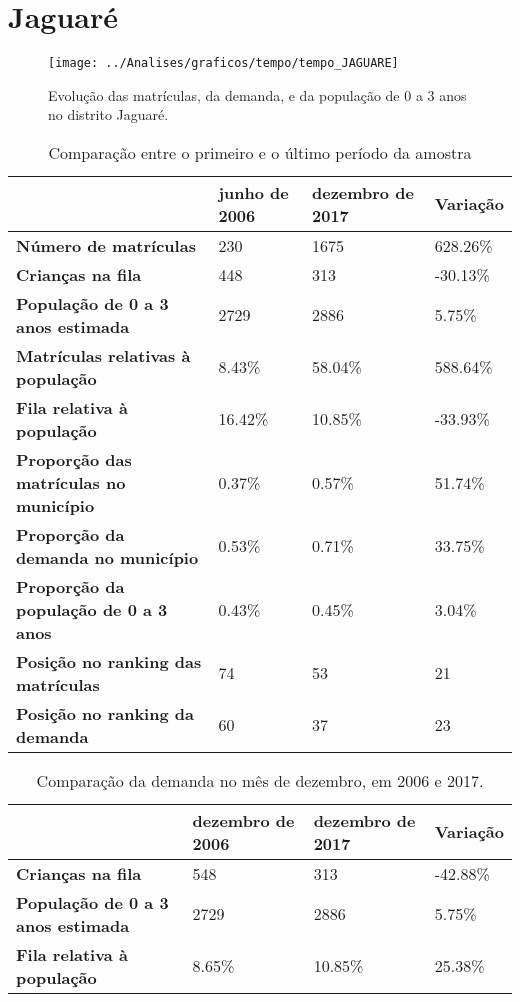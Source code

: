 \section{Jaguaré}
\begin{figure}[H]
\centering
\texttt{[image: ../Analises/graficos/tempo/tempo\_JAGUARE]}
\caption{Evolução das matrículas, da demanda, e da população de 0 a 3 anos no distrito Jaguaré.}
\end{figure}
\begin{table}[H]
\begin{tabular}{|l|l|l|l|}
\hline
\textbf{}                                      & \textbf{junho de 2006}       & \textbf{dezembro de 2017}    & \textbf{Variação} \\ \hline
\textbf{Número de matrículas}                  & 230 & 1675 & 628.26\% \\ \hline
\textbf{Crianças na fila}                      & 448 & 313 & -30.13\% \\ \hline
\textbf{População de 0 a 3 anos estimada}      & 2729 & 2886 & 5.75\% \\ \hline
\textbf{Matrículas relativas à população}      & 8.43\% & 58.04\% & 588.64\% \\ \hline
\textbf{Fila relativa à população}             & 16.42\% & 10.85\% & -33.93\% \\ \hline
\textbf{Proporção das matrículas no município} & 0.37\% & 0.57\% & 51.74\% \\ \hline
\textbf{Proporção da demanda no município}     & 0.53\% & 0.71\% & 33.75\% \\ \hline
\textbf{Proporção da população de 0 a 3 anos}  & 0.43\% & 0.45\% & 3.04\% \\ \hline
\textbf{Posição no ranking das matrículas}     & 74 & 53 & 21 \\ \hline
\textbf{Posição no ranking da demanda}         & 60 & 37 & 23 \\ \hline
\end{tabular}
\caption{Comparação entre o primeiro e o último período da amostra}
\end{table}
\begin{table}[H]
\begin{tabular}{|l|l|l|l|}
\hline
\textbf{}                                 & \textbf{dezembro de 2006} & \textbf{dezembro de 2017} & \textbf{Variação} \\ \hline
\textbf{Crianças na fila}                      & 548 & 313 & -42.88\% \\ \hline
\textbf{População de 0 a 3 anos estimada}      & 2729 & 2886 & 5.75\% \\ \hline
\textbf{Fila relativa à população}             & 8.65\% & 10.85\% & 25.38\% \\ \hline
\end{tabular}
\caption{Comparação da demanda no mês de dezembro, em 2006 e 2017.}
\end{table}
